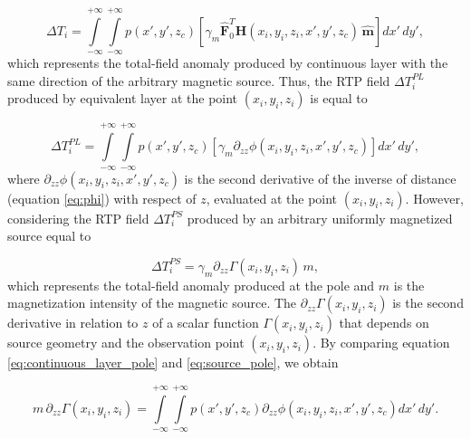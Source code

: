 \begin{equation}
\Delta T_i = \int \limits_{-\infty}^{+\infty } \int \limits_{-\infty}^{+\infty }  p(x',y',z_c)  [\gamma_m \hat{\mathbf{F}}_0^T \mathbf{H}(x_i,y_i,z_i,x',y',z_c) \,\hat{\mathbf{m}}] dx' \,dy',
\label{eq:continuous_layer_source}
\end{equation} 
which represents the total-field anomaly produced by continuous layer with the same direction of the arbitrary magnetic source. Thus, the RTP field $\Delta T_{i}^{PL}$ produced by equivalent layer at the point $(x_i,y_i,z_i)$ is equal to 

\begin{equation}
\Delta T_{i}^{PL} = \int \limits_{-\infty}^{+\infty } \int \limits_{-\infty}^{+\infty }  p(x',y',z_c)  [\gamma_m \partial_{zz} \phi(x_i,y_i,z_i,x',y',z_c) ] dx' \,dy',
\label{eq:continuous_layer_pole}
\end{equation}
where $\partial_{zz} \phi(x_i,y_i,z_i,x',y',z_c)$ is the second derivative of the inverse of distance (equation \ref{eq:phi}) with respect of $z$, evaluated at the point $(x_i,y_i,z_i)$. However, considering the RTP field $\Delta T_{i}^{PS}$ produced by an arbitrary uniformly magnetized source equal to

\begin{equation}
\Delta T_{i}^{PS} = \gamma_m \partial_{zz} \Gamma(x_i,y_i,z_i) \, m,
\label{eq:source_pole}
\end{equation}
which represents the total-field anomaly produced at the pole and $m$ is the magnetization intensity of the magnetic source. The $\partial_{zz} \Gamma(x_i,y_i,z_i)$ is the second derivative in relation to $z$ of a scalar function $\Gamma(x_i,y_i,z_i)$ that depends on source geometry and the observation point $(x_i,y_i,z_i)$. By comparing equation \ref{eq:continuous_layer_pole} and \ref{eq:source_pole}, we obtain 
 
\begin{equation}
m \, \partial_{zz} \Gamma(x_i,y_i,z_i) = \int \limits_{-\infty}^{+\infty } \int \limits_{-\infty}^{+\infty }  p(x',y',z_c)  \partial_{zz} \phi(x_i,y_i,z_i,x',y',z_c)  dx' \,dy'.
\label{eq:source_layer_pole}
\end{equation}
     
